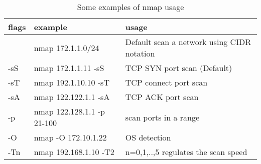 \begin{table}[!hbtp]
\begin{tabular}{|l|l|l|}
\hline
flags & example                    & usage                                      \\ \hline
      & nmap 172.1.1.0/24          & Default scan a network using CIDR notation \\ \hline
-sS   & nmap 172.1.1.11 -sS        & TCP SYN port scan (Default)                \\ \hline
-sT   & nmap 192.1.10.10 -sT       & TCP connect port scan                      \\ \hline
-sA   & nmap 122.122.1.1 -sA       & TCP ACK port scan                          \\ \hline
-p    & nmap 122.128.1.1 -p 21-100 & scan ports in a range                      \\ \hline
-O    & nmap -O 172.10.1.22        & OS detection                               \\ \hline
-Tn   & nmap 192.168.1.10 -T2      & n={0,1,..,5} regulates the scan speed      \\ \hline
\end{tabular}
\caption{Some examples of nmap usage}
\label{tab:my-table}
\end{table}

